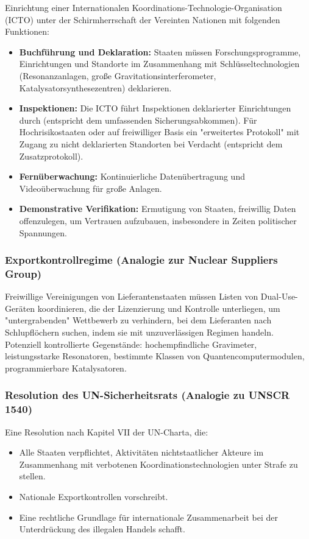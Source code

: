 \documentclass[12pt,a4paper]{article}
\theoremstyle{remark}
\begin{document}
	Einrichtung einer Internationalen Koordinations-Technologie-Organisation (ICTO) unter der Schirmherrschaft der Vereinten Nationen mit folgenden Funktionen:
	\begin{itemize}
		\item \textbf{Buchführung und Deklaration:} Staaten müssen Forschungsprogramme, Einrichtungen und Standorte im Zusammenhang mit Schlüsseltechnologien (Resonanzanlagen, große Gravitationsinterferometer, Katalysatorsynthesezentren) deklarieren.
		\item \textbf{Inspektionen:} Die ICTO führt Inspektionen deklarierter Einrichtungen durch (entspricht dem umfassenden Sicherungsabkommen). Für Hochrisikostaaten oder auf freiwilliger Basis ein "erweitertes Protokoll" mit Zugang zu nicht deklarierten Standorten bei Verdacht (entspricht dem Zusatzprotokoll).
		\item \textbf{Fernüberwachung:} Kontinuierliche Datenübertragung und Videoüberwachung für große Anlagen.
		\item \textbf{Demonstrative Verifikation:} Ermutigung von Staaten, freiwillig Daten offenzulegen, um Vertrauen aufzubauen, insbesondere in Zeiten politischer Spannungen.
	\end{itemize}
	
	\subsubsection{Exportkontrollregime (Analogie zur Nuclear Suppliers Group)}
	
	Freiwillige Vereinigungen von Lieferantenstaaten müssen Listen von Dual-Use-Geräten koordinieren, die der Lizenzierung und Kontrolle unterliegen, um "untergrabenden" Wettbewerb zu verhindern, bei dem Lieferanten nach Schlupflöchern suchen, indem sie mit unzuverlässigen Regimen handeln. Potenziell kontrollierte Gegenstände: hochempfindliche Gravimeter, leistungsstarke Resonatoren, bestimmte Klassen von Quantencomputermodulen, programmierbare Katalysatoren.
	
	\subsubsection{Resolution des UN-Sicherheitsrats (Analogie zu UNSCR 1540)}
	
	Eine Resolution nach Kapitel VII der UN-Charta, die:
	\begin{itemize}
		\item Alle Staaten verpflichtet, Aktivitäten nichtstaatlicher Akteure im Zusammenhang mit verbotenen Koordinationstechnologien unter Strafe zu stellen.
		\item Nationale Exportkontrollen vorschreibt.
		\item Eine rechtliche Grundlage für internationale Zusammenarbeit bei der Unterdrückung des illegalen Handels schafft.
	\end{itemize}
	
\end{document}

